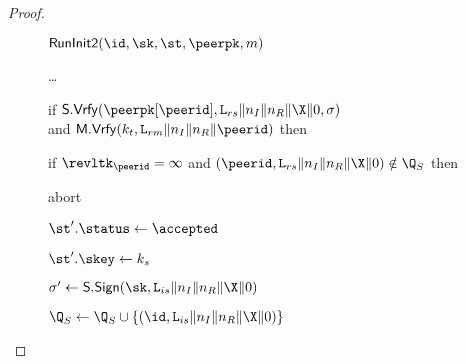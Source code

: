 \begin{proof}
\begin{collectinmacro}{\SIGMIProofSignatureMAC}{}{}
\begin{figure}[tp]
\begin{minipage}[t]{0.49\textwidth}
		\begin{oracle}{$\RunInit(\id,\sk,\st,\peerpk,m)$}
			\item \dots
			\item if $\SIGScheme.\SIGVerify(\peerpk[\peerid], \labelrs\|\nonce_I\|\nonce_R\|\X\|\Y, \sigma)$\\
				and $\MACScheme.\MACVerify(\kt, \labelrm\|\nonce_I\|\nonce_R\|\peerid)$ then
			\item \hindent if $\revltk_{\peerid} = \infty$ and \newline
				\null \hindent \hindent $(\peerid, \labelrs\|\nonce_I\|\nonce_R\|\X\|\Y) \notin \Q_{S}$ then
			\item \hindent \hindent abort
			\item \hindent {}\newline
				\null \hindent \hindent {}
			\item \hindent \hindent \gamechange{$\bad[M] \gets \true$} 
			\item \hindent $\st'.\status \gets \accepted$
			\item \hindent $\st'.\skey \gets \ks$
			\item \hindent $\sigma' \gets \SIGScheme.\SIGSign(\sk, \labelis\|\nonce_I\|\nonce_R\|\X\|\Y)$
			\item \hindent $\Q_{S} \gets \Q_{S} \cup \{(\id, \labelis\|\nonce_I\|\nonce_R\|\X\|\Y)\}$

\end{oracle}
\end{minipage}
\end{figure}
\end{collectinmacro}
\end{proof}
